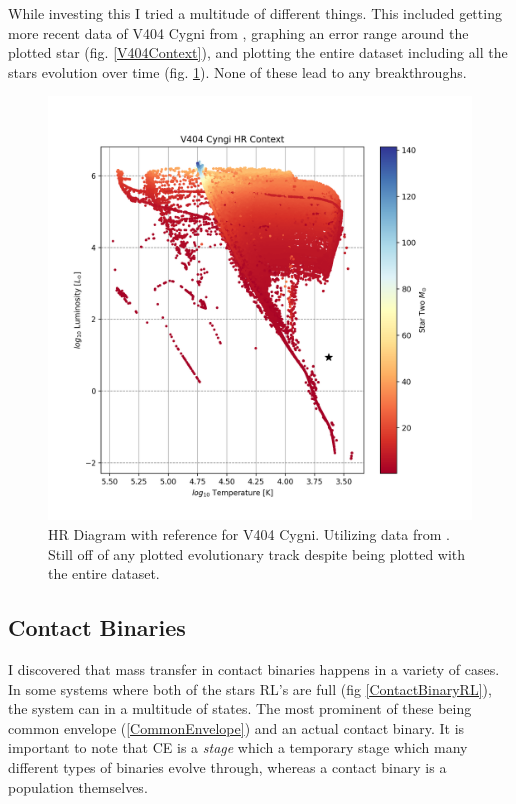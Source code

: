 \documentclass[12pt, a4paper]{article}
\begin{document}
            While investing this I tried a multitude of different things. This included getting more recent data of V404 Cygni from \parencite{Bartolomeo_2023}, graphing an error range around the plotted star (fig. \ref{V404Context}), and plotting the entire dataset including all the stars evolution over time (fig. \ref{V404FullContextTesting}). None of these lead to any breakthroughs. 

            \begin{figure}[H] 
                \centering
                \includegraphics[scale = .6]{figs/GeneratedFigs/V404_Cygni/V404EntireDatasetPopulationHRComp.png}
                \caption{HR Diagram with reference for V404 Cygni. Utilizing data from \parencite{Bartolomeo_2023}. Still off of any plotted evolutionary track despite being plotted with the entire dataset.}
                \label{V404FullContextTesting}
            \end{figure}

        \subsection{\centering Contact Binaries}
            I discovered that mass transfer in contact binaries happens in a variety of cases. In some systems where both of the stars RL's are full (fig \ref{ContactBinaryRL}), the system can in a multitude of states. The most prominent of these being common envelope (\ref{CommonEnvelope}) and an actual contact binary. It is important to note that CE is a \textit{stage} which a temporary stage which many different types of binaries evolve through, whereas a contact binary is a population themselves.
\end{document}
